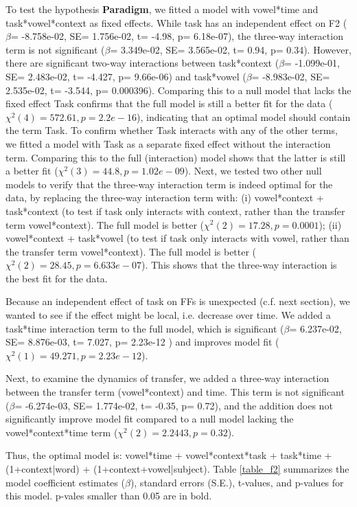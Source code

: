 \documentclass[12 pt]{article}
\begin{document}
To test the hypothesis \textbf{Paradigm}, we fitted a model with vowel*time and task*vowel*context as fixed effects. While task has an independent effect on F2 ($\beta$= -8.758e-02, SE= 1.756e-02, t= -4.98, p= 6.18e-07), the three-way interaction term is not significant ($\beta$= 3.349e-02, SE= 3.565e-02, t= 0.94, p= 0.34). However, there are significant two-way interactions between task*context ($\beta$= -1.099e-01, SE= 2.483e-02, t= -4.427, p= 9.66e-06) and task*vowel ($\beta$= -8.983e-02, SE= 2.535e-02, t= -3.544, p= 0.000396). Comparing this to a null model that lacks the fixed effect Task confirms that the full model is still a better fit for the data ($\chi^2(4) = 572.61, p=  2.2e-16$), indicating that an optimal model should contain the term Task. To confirm whether Task interacts with any of the other terms, we fitted a model with Task as a separate fixed effect without the interaction term. Comparing this to the full (interaction) model shows that the latter is still a better fit ($\chi^2(3) = 44.8, p= 1.02e-09$). Next, we tested two other null models to verify that the three-way interaction term is indeed optimal for the data, by replacing the three-way interaction term with: (i) vowel*context + task*context (to test if task only interacts with context, rather than the transfer term vowel*context). The full model is better ($\chi^2(2) = 17.28, p= 0.0001$); (ii) vowel*context + task*vowel (to test if task only interacts with vowel, rather than the transfer term vowel*context). The full model is better ($\chi^2(2) = 28.45, p= 6.633e-07$). This shows that the three-way interaction is the best fit for the data.

Because an independent effect of task on FFs is unexpected \alert{(c.f. next section)}, we wanted to see if the effect might be local, i.e. decrease over time. We added a task*time interaction term to the full model, which is significant ($\beta$= 6.237e-02, SE=  8.876e-03, t= 7.027, p= 2.23e-12 ) and improves model fit ($\chi^2(1) = 49.271, p= 2.23e-12$).
	
Next, to examine the dynamics of transfer, we added a three-way interaction between the transfer term (vowel*context) and time. This term is not significant ($\beta$= -6.274e-03, SE= 1.774e-02, t= -0.35, p= 0.72), and the addition does not significantly improve model fit compared to a null model lacking the vowel*context*time term ($\chi^2(2) = 2.2443, p= 0.32$).

Thus, the optimal model is: vowel*time + vowel*context*task + task*time + (1+context|word) + (1+context+vowel|subject). Table \ref{table_f2} summarizes the model coefficient estimates ($\beta$), standard errors (S.E.), t-values, and p-values for this model. \alert{p-vales smaller than 0.05 are in bold.} 
\end{document}
